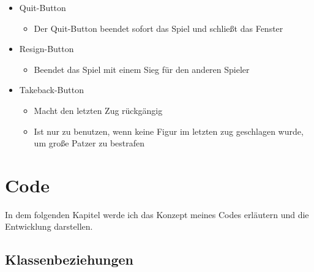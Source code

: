 \documentclass[a4paper, 10pt]{scrartcl}
\begin{document}
\begin{itemize}
        \item \glqq Quit\grqq-Button
        \begin{itemize}
                \item Der Quit-Button beendet sofort das Spiel und schließt das Fenster
        \end{itemize}
        \item \glqq Resign\grqq-Button
        \begin{itemize}
                \item Beendet das Spiel mit einem Sieg für den anderen Spieler
        \end{itemize}
        \item \glqq Takeback\grqq-Button
        \begin{itemize}
                \item Macht den letzten Zug rückgängig
                \item Ist nur zu benutzen, wenn keine Figur im 
                letzten zug geschlagen wurde, um große Patzer zu bestrafen
        \end{itemize}
\end{itemize}


\pagebreak
\section{Code}
In dem folgenden Kapitel werde ich das Konzept meines Codes erläutern und die Entwicklung darstellen. 


\subsection{Klassenbeziehungen}
\end{document}
